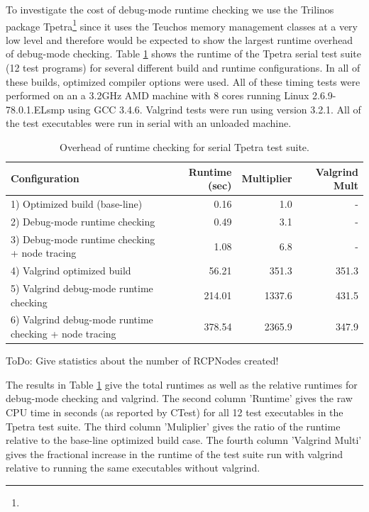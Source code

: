 \documentclass[pdf,ps2pdf,11pt]{SANDreport}
\begin{document}
To investigate the cost of debug-mode runtime checking we use the
Trilinos package
Tpetra\footnote{{}}
since it uses the Teuchos memory management classes at a very low
level and therefore would be expected to show the largest runtime
overhead of debug-mode checking.  Table
{}\ref{tbl:overhead-of-runtime-checking} shows the runtime of the
Tpetra serial test suite (12 test programs) for several different
build and runtime configurations.  In all of these builds, optimized
compiler options were used.  All of these timing tests were performed
on an a 3.2GHz AMD machine with 8 cores running Linux
2.6.9-78.0.1.ELsmp using GCC 3.4.6.  Valgrind tests were run using
version 3.2.1.  All of the test executables were run in serial with an
unloaded machine.

\begin{table}
%
\begin{center}
%
{\small\begin{tabular}{|l|r|r|r|}
\hline
Configuration
& Runtime (sec)
& Multiplier
& Valgrind Mult \\
\hline
\hline
1) Optimized build (base-line)
& 0.16
& 1.0
& - \\
\hline
2) Debug-mode runtime checking
& 0.49
& 3.1
& - \\
\hline
3) Debug-mode runtime checking + node tracing
& 1.08
& 6.8
& - \\
\hline
4) Valgrind optimized build
& 56.21
& 351.3
& 351.3 \\
\hline
5) Valgrind debug-mode runtime checking
& 214.01
& 1337.6
& 431.5 \\
\hline
6) Valgrind debug-mode runtime checking + node tracing
& 378.54
& 2365.9
& 347.9 \\
\hline
\end{tabular}}
%
\end{center}
%
\caption{\label{tbl:overhead-of-runtime-checking}
Overhead of runtime checking for serial Tpetra test suite.}
%
\end{table}

ToDo: Give statistics about the number of RCPNodes created!

The results in Table {}\ref{tbl:overhead-of-runtime-checking} give the
total runtimes as well as the relative runtimes for debug-mode
checking and valgrind.  The second column 'Runtime' gives the raw CPU
time in seconds (as reported by CTest) for all 12 test executables in
the Tpetra test suite.  The third column 'Muliplier' gives the ratio
of the runtime relative to the base-line optimized build case.  The
fourth column 'Valgrind Multi' gives the fractional increase in the
runtime of the test suite run with valgrind relative to running the
same executables without valgrind.
\end{document}
